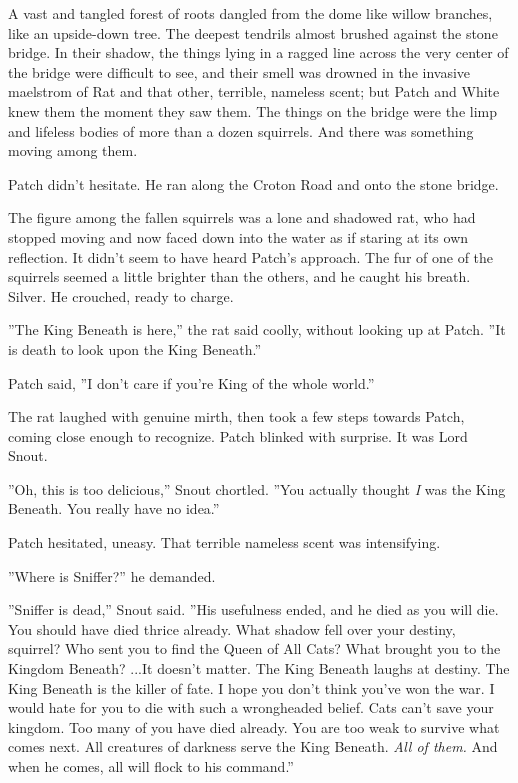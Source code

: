 \documentclass[12pt]{book}
\begin{document}
A vast and tangled forest of roots dangled from the dome like willow branches, like an upside-down tree. The deepest tendrils almost brushed against the stone bridge. In their shadow, the things lying in a ragged line across the very center of the bridge were difficult to see, and their smell was drowned in the invasive maelstrom of Rat and that other, terrible, nameless scent; but Patch and White knew them the moment they saw them. The things on the bridge were the limp and lifeless bodies of more than a dozen squirrels. And there was something moving among them.

Patch didn't hesitate. He ran along the Croton Road and onto the stone bridge.

The figure among the fallen squirrels was a lone and shadowed rat, who had stopped moving and now faced down into the water as if staring at its own reflection. It didn't seem to have heard Patch's approach. The fur of one of the squirrels seemed a little brighter than the others, and he caught his breath. Silver. He crouched, ready to charge.

''The King Beneath is here,'' the rat said coolly, without looking up at Patch. ''It is death to look upon the King Beneath.''

Patch said, ''I don't care if you're King of the whole world.''

The rat laughed with genuine mirth, then took a few steps towards Patch, coming close enough to recognize. Patch blinked with surprise. It was Lord Snout.

''Oh, this is too delicious,'' Snout chortled. ''You actually thought {\it I} was the King Beneath. You really have no idea.''

Patch hesitated, uneasy. That terrible nameless scent was intensifying.

''Where is Sniffer?'' he demanded.

''Sniffer is dead,'' Snout said. ''His usefulness ended, and he died as you will die. You should have died thrice already. What shadow fell over your destiny, squirrel? Who sent you to find the Queen of All Cats? What brought you to the Kingdom Beneath? ...It doesn't matter. The King Beneath laughs at destiny. The King Beneath is the killer of fate. I hope you don't think you've won the war. I would hate for you to die with such a wrongheaded belief. Cats can't save your kingdom. Too many of you have died already. You are too weak to survive what comes next. All creatures of darkness serve the King Beneath. {\it All of them.} And when he comes, all will flock to his command.''
\end{document}
